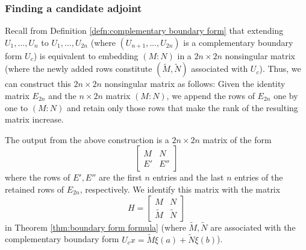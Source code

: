 \documentclass[12pt, oneside, a4paper]{article}
\begin{document}
\subsubsection{Finding a candidate adjoint}
Recall from Definition \ref{defn:complementary boundary form} that extending $U_1,\ldots,U_n$ to $U_1,\ldots,U_{2n}$ (where $(U_{n+1},\ldots, U_{2n})$ is a complementary boundary form $U_c$) is equivalent to embedding $(M:N)$ in a $2n\times 2n$ nonsingular matrix (where the newly added rows constitute $(\tilde{M}, \tilde{N})$ associated with $U_c$). Thus, we can construct this $2n\times 2n$ nonsingular matrix as follows: Given the identity matrix $E_{2n}$ and the $n\times 2n$ matrix $(M:N)$, we append the rows of $E_{2n}$ one by one to $(M:N)$ and retain only those rows that make the rank of the resulting matrix increase.


The output from the above construction is a $2n\times 2n$ matrix of the form
\[\begin{bmatrix}M & N\\ E' & E''\end{bmatrix}\]
where the rows of $E', E''$ are the first $n$ entries and the last $n$ entries of the retained rows of $E_{2n}$, respectively. We identify this matrix with the matrix
\[H = \begin{bmatrix}M&N\\ \tilde{M} & \tilde{N}\end{bmatrix}\]
in Theorem \ref{thm:boundary form formula} (where $\tilde{M}, \tilde{N}$ are associated with the complementary boundary form $U_c x = \tilde{M}\xi(a) + \tilde{N}\xi(b)$).
\end{document}
